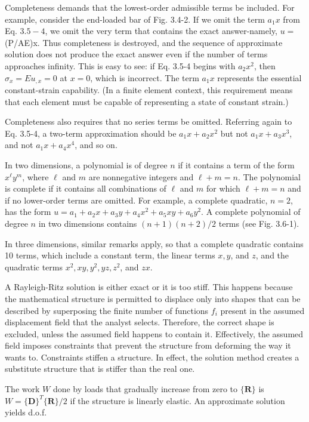 \documentclass[10pt]{article}
\begin{document}
Completeness demands that the lowest-order admissible terms be included. For example, consider the end-loaded bar of Fig. 3.4-2. If we omit the term $a_{1} x$ from Eq. $3.5-4$, we omit the very term that contains the exact answer-namely, $u=$ (P/AE)x. Thus completeness is destroyed, and the sequence of approximate solution does not produce the exact answer even if the number of terms approaches infinity. This is easy to see: if Eq. 3.5-4 begins with $a_{2} x^{2}$, then $\sigma_{x}=E u_{,x}=0$ at $x=0$, which is incorrect. The term $a_{1} x$ represents the essential constant-strain capability. (In a finite element context, this requirement means that each element must be capable of representing a state of constant strain.)

Completeness also requires that no series terms be omitted. Referring again to Eq. 3.5-4, a two-term approximation should be $a_{1} x+a_{2} x^{2}$ but not $a_{1} x+a_{3} x^{3}$, and not $a_{1} x+a_{4} x^{4}$, and so on.

In two dimensions, a polynomial is of degree $n$ if it contains a term of the form $x^{\ell} y^{m}$, where $\ell$ and $m$ are nonnegative integers and $\ell+m=n$. The polynomial is complete if it contains all combinations of $\ell$ and $m$ for which $\ell+m=n$ and if no lower-order terms are omitted. For example, a complete quadratic, $n=2$, has the form $u=a_{1}+a_{2} x+a_{3} y+a_{4} x^{2}+a_{5} x y+a_{6} y^{2}$. A complete polynomial of degree $n$ in two dimensions contains $(n+1)(n+2) / 2$ terms (see Fig. 3.6-1).

In three dimensions, similar remarks apply, so that a complete quadratic contains 10 terms, which include a constant term, the linear terms $x, y$, and $z$, and the quadratic terms $x^{2}, x y, y^{2}, y z, z^{2}$, and $z x$.

A Rayleigh-Ritz solution is either exact or it is too stiff. This happens because the mathematical structure is permitted to displace only into shapes that can be described by superposing the finite number of functions $f_{i}$ present in the assumed displacement field that the analyst selects. Therefore, the correct shape is excluded, unless the assumed field happens to contain it. Effectively, the assumed field imposes constraints that prevent the structure from deforming the way it wants to. Constraints stiffen a structure. In effect, the solution method creates a substitute structure that is stiffer than the real one.

The work $W$ done by loads that gradually increase from zero to $\{\mathbf{R}\}$ is $W= \{\mathbf{D}\}^{T}\{\mathbf{R}\} / 2$ if the structure is linearly elastic. An approximate solution yields d.o.f.
\end{document}
